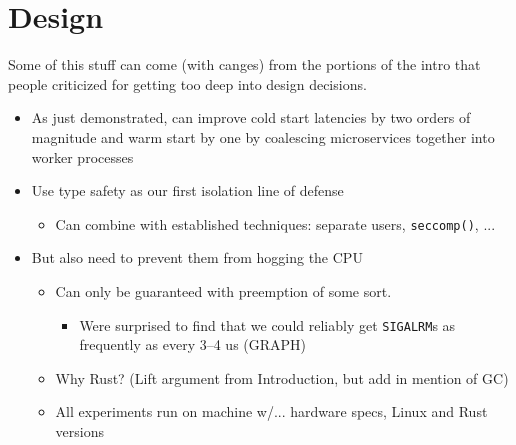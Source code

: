 \section{Design}
\label{sec:design}

Some of this stuff can come (with canges) from the portions of the intro that people criticized for getting too deep into design decisions.

\begin{itemize}
\item As just demonstrated, can improve cold start latencies by two orders of magnitude and warm start by one by coalescing microservices together into worker processes
\item Use type safety as our first isolation line of defense
\begin{itemize}
\item Can combine with established techniques: separate users, \texttt{seccomp()}, ...
\end{itemize}
\item But also need to prevent them from hogging the CPU
\begin{itemize}
\item Can only be guaranteed with preemption of some sort.
\begin{itemize}
\item Were surprised to find that we could reliably get \texttt{SIGALRM}s as frequently as every 3--4 us (GRAPH)
\end{itemize}
\item Why Rust? (Lift argument from Introduction, but add in mention of GC)
\item All experiments run on machine w/... hardware specs, Linux and Rust versions
\end{itemize}


\end{itemize}
